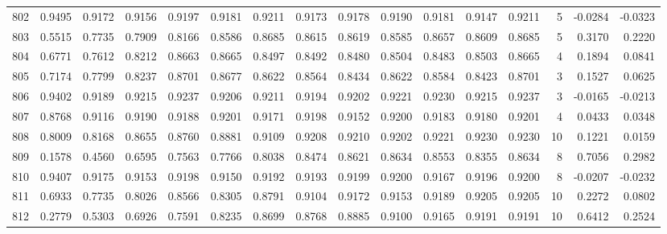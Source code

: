 \begin{tabular}{lrrrrrrrrrrrrrrr}
802 &      0.9495 &  0.9172 &  0.9156 &  0.9197 &  0.9181 &  0.9211 &  0.9173 &  0.9178 &  0.9190 &  0.9181 &   0.9147 &     0.9211 &      5 &                   -0.0284 &                    -0.0323 \\
803 &      0.5515 &  0.7735 &  0.7909 &  0.8166 &  0.8586 &  0.8685 &  0.8615 &  0.8619 &  0.8585 &  0.8657 &   0.8609 &     0.8685 &      5 &                    0.3170 &                     0.2220 \\
804 &      0.6771 &  0.7612 &  0.8212 &  0.8663 &  0.8665 &  0.8497 &  0.8492 &  0.8480 &  0.8504 &  0.8483 &   0.8503 &     0.8665 &      4 &                    0.1894 &                     0.0841 \\
805 &      0.7174 &  0.7799 &  0.8237 &  0.8701 &  0.8677 &  0.8622 &  0.8564 &  0.8434 &  0.8622 &  0.8584 &   0.8423 &     0.8701 &      3 &                    0.1527 &                     0.0625 \\
806 &      0.9402 &  0.9189 &  0.9215 &  0.9237 &  0.9206 &  0.9211 &  0.9194 &  0.9202 &  0.9221 &  0.9230 &   0.9215 &     0.9237 &      3 &                   -0.0165 &                    -0.0213 \\
807 &      0.8768 &  0.9116 &  0.9190 &  0.9188 &  0.9201 &  0.9171 &  0.9198 &  0.9152 &  0.9200 &  0.9183 &   0.9180 &     0.9201 &      4 &                    0.0433 &                     0.0348 \\
808 &      0.8009 &  0.8168 &  0.8655 &  0.8760 &  0.8881 &  0.9109 &  0.9208 &  0.9210 &  0.9202 &  0.9221 &   0.9230 &     0.9230 &     10 &                    0.1221 &                     0.0159 \\
809 &      0.1578 &  0.4560 &  0.6595 &  0.7563 &  0.7766 &  0.8038 &  0.8474 &  0.8621 &  0.8634 &  0.8553 &   0.8355 &     0.8634 &      8 &                    0.7056 &                     0.2982 \\
810 &      0.9407 &  0.9175 &  0.9153 &  0.9198 &  0.9150 &  0.9192 &  0.9193 &  0.9199 &  0.9200 &  0.9167 &   0.9196 &     0.9200 &      8 &                   -0.0207 &                    -0.0232 \\
811 &      0.6933 &  0.7735 &  0.8026 &  0.8566 &  0.8305 &  0.8791 &  0.9104 &  0.9172 &  0.9153 &  0.9189 &   0.9205 &     0.9205 &     10 &                    0.2272 &                     0.0802 \\
812 &      0.2779 &  0.5303 &  0.6926 &  0.7591 &  0.8235 &  0.8699 &  0.8768 &  0.8885 &  0.9100 &  0.9165 &   0.9191 &     0.9191 &     10 &                    0.6412 &                     0.2524 \\

\end{tabular}
